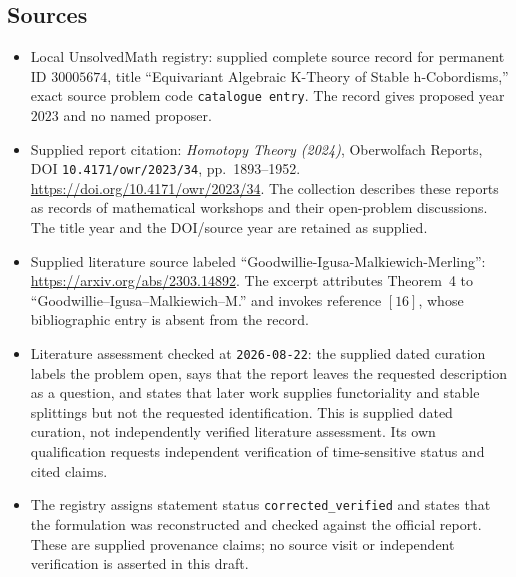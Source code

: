 \documentclass[11pt]{article}
\begin{document}
\subsection{Sources}
\begin{itemize}
\item Local UnsolvedMath registry: supplied complete source record for permanent ID \(30005674\), title ``Equivariant Algebraic K-Theory of Stable h-Cobordisms,'' exact source problem code \texttt{catalogue entry}. The record gives proposed year \(2023\) and no named proposer.
\item Supplied report citation: \emph{Homotopy Theory (2024)}, Oberwolfach Reports, DOI \texttt{10.4171/owr/2023/34}, pp.~1893--1952. \url{https://doi.org/10.4171/owr/2023/34}. The collection describes these reports as records of mathematical workshops and their open-problem discussions. The title year and the DOI/source year are retained as supplied.
\item Supplied literature source labeled ``Goodwillie-Igusa-Malkiewich-Merling'': \url{https://arxiv.org/abs/2303.14892}. The excerpt attributes Theorem~4 to ``Goodwillie--Igusa--Malkiewich--M.'' and invokes reference \([16]\), whose bibliographic entry is absent from the record.
\item Literature assessment checked at \texttt{2026-08-22}: the supplied dated curation labels the problem open, says that the report leaves the requested description as a question, and states that later work supplies functoriality and stable splittings but not the requested identification. This is supplied dated curation, not independently verified literature assessment. Its own qualification requests independent verification of time-sensitive status and cited claims.
\item The registry assigns statement status \texttt{corrected\_verified} and states that the formulation was reconstructed and checked against the official report. These are supplied provenance claims; no source visit or independent verification is asserted in this draft.
\end{itemize}
\end{document}
